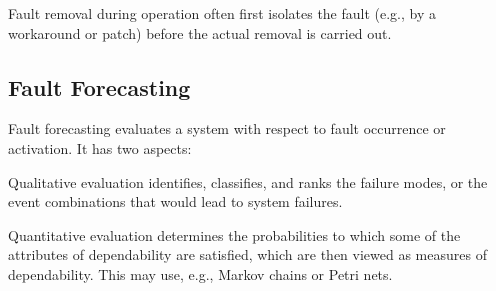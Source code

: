 Fault removal during operation often first isolates the fault (e.g., by a workaround or patch) before the actual removal is carried out.

\subsection{Fault Forecasting}

Fault forecasting evaluates a system with respect to fault occurrence or activation.
It has two aspects:
\begin{compactitem}
  \item Qualitative evaluation identifies, classifies, and ranks the failure modes, or the event combinations that would lead to system failures.
  \item Quantitative evaluation determines the probabilities to which some of the attributes of dependability are satisfied, which are then viewed as measures of dependability.
  This may use, e.g., Markov chains or Petri nets.
\end{compactitem}

%

